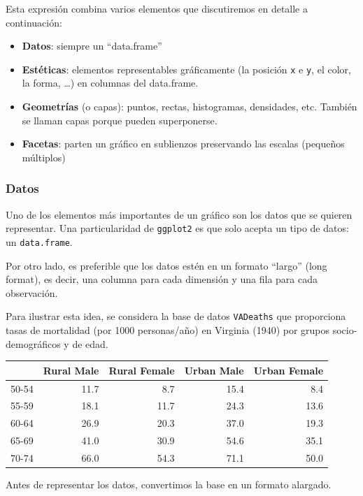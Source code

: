 \documentclass[
]{article}
\providecommand{\tightlist}{%
  \setlength{\itemsep}{0pt}\setlength{\parskip}{0pt}}
\numberwithin{ejcnt}{section}
\begin{document}
Esta expresión combina varios elementos que discutiremos en detalle a continuación:

\begin{itemize}
\tightlist
\item
  \textbf{Datos}: siempre un ``data.frame''
\item
  \textbf{Estéticas}: elementos representables gráficamente (la posición \texttt{x} e \texttt{y}, el color, la forma, \ldots) en columnas del data.frame.
\item
  \textbf{Geometrías} (o capas): puntos, rectas, histogramas, densidades, etc. También se llaman capas porque pueden superponerse.
\item
  \textbf{Facetas}: parten un gráfico en sublienzos preservando las escalas (pequeños múltiplos)
\end{itemize}

\hypertarget{datos}{%
\subsubsection{Datos}\label{datos}}

Uno de los elementos más importantes de un gráfico son los datos que se quieren representar. Una particularidad de \texttt{ggplot2} es que solo acepta un tipo de datos: un \texttt{data.frame}.

Por otro lado, es preferible que los datos estén en un formato ``largo'' (long format), es decir, una columna para cada dimensión y una fila para cada observación.

Para ilustrar esta idea, se considera la base de datos \texttt{VADeaths} que proporciona tasas de mortalidad (por 1000 personas/año) en Virginia (1940) por grupos socio-demográficos y de edad.

\begin{tabular}{lrrrr}
\toprule
  & Rural Male & Rural Female & Urban Male & Urban Female\\
\midrule
50-54 & 11.7 & 8.7 & 15.4 & 8.4\\
55-59 & 18.1 & 11.7 & 24.3 & 13.6\\
60-64 & 26.9 & 20.3 & 37.0 & 19.3\\
65-69 & 41.0 & 30.9 & 54.6 & 35.1\\
70-74 & 66.0 & 54.3 & 71.1 & 50.0\\
\bottomrule
\end{tabular}

Antes de representar los datos, convertimos la base en un formato alargado.
\end{document}
